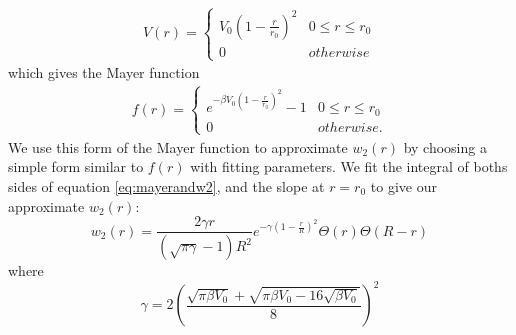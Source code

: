 \documentclass[letterpaper,twocolumn,amsmath,amssymb,prb]{revtex4-1}
\newcommand{\rr}{\textbf{r}}
\begin{document}
\begin{align}
  V(r) =
  \begin{cases}
    V_0 \left ( 1 - \frac{r}{r_0} \right )^2 & 0 \leq r \leq r_0\\
    0 & otherwise
  \end{cases}
\end{align}
which gives the Mayer function 
\begin{align}
  f(r) =
  \begin{cases}
    e^{-\beta V_0 \left( 1 - \frac{r}{r_0} \right)^2} - 1 & 0 \leq r
    \leq r_0 \\
    0 & otherwise.
  \end{cases} 
\end{align}
We use this form of the Mayer function to approximate $w_2(r)$ by
choosing a simple form similar to $f(r)$ with fitting parameters. We fit the
integral of boths sides of equation \ref{eq:mayerandw2}, and the
slope at $r=r_0$ to give our approximate $w_2(r)$: 
\begin{equation}
  w_2(r) = \frac{2\gamma r}{(\sqrt{\pi \gamma} - 1)R^2} e^{-\gamma
    \left ( 1 - \frac{r}{R} \right )^2}\Theta(r) \Theta (R - r)
\end{equation}
where
\begin{equation}
  \gamma = 2 \left(\frac{\sqrt{\pi \beta V_0} + \sqrt{\pi \beta V_0 -
    16\sqrt{\beta V_0}}}{8}\right)^2
\end{equation}
\end{document}
